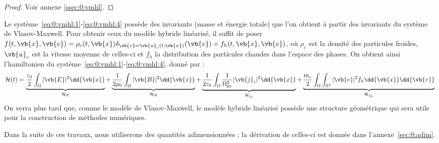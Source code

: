 \begin{proof}
  Voir annexe \ref{ssec:0:vmhl}.
\end{proof}

Le système~\eqref{eq:0:vmhl:1}-\eqref{eq:0:vmhl:4} possède des invariants (masse et énergie totale) que l'on obtient à partir des invariants du système de Vlasov-Maxwell. Pour obtenir ceux du modèle hybride linéarisé, il suffit de poser $f(t,\vb{x},\vb{v})=\rho_c(t,\vb{x})\delta_{\vb{v}=\vb{u}_c(t,\vb{x})}(\vb{v}) + f_h(t,\vb{x},\vb{v})$, où $\rho_c$ est la densité des particules froides, $\vb{u}_c$ est la vitesse moyenne de celles-ci et $f_h$ la distribution des particules chaudes dans l'espace des phases. On obtient ainsi l'hamiltonien du système~\eqref{eq:0:vmhl:1}-\eqref{eq:0:vmhl:4}, donné par :
\begin{equation}
  \mathcal{H}(t) = \underbrace{\frac{\varepsilon_0}{2} \int_{\Omega} |\vb{E}|^2 \dd{\vb{x}} }_{\mathcal{H}_E}
              + \underbrace{\frac{1}{2\mu_0}        \int_{\Omega} |\vb{B}|^2 \dd{\vb{x}} }_{\mathcal{H}_B}
              + \underbrace{\frac{1}{2\varepsilon_0}\int_{\Omega} \frac{1}{\Omega_{pe}^2}|\vb{j}_c|^2 \dd{\vb{x}} }_{\mathcal{H}_{j_c}}
              + \underbrace{\frac{m_e}{2}           \int_{\Omega}\int_{\mathbb{R}^3} |\vb{v}|^2f_h \dd{\vb{x}}\dd{\vb{v}} }_{\mathcal{H}_{f_h}}
\end{equation}
On verra plus tard que, comme le modèle de Vlasov-Maxwell, le modèle hybride linéarisé possède une structure géométrique qui sera utile pour la construction de méthodes numériques.

Dans la suite de ces travaux, nous utiliserons des quantités adimensionnées ; la dérivation de celles-ci est donnée dans l'annexe~\ref{sec:0:adim}.
